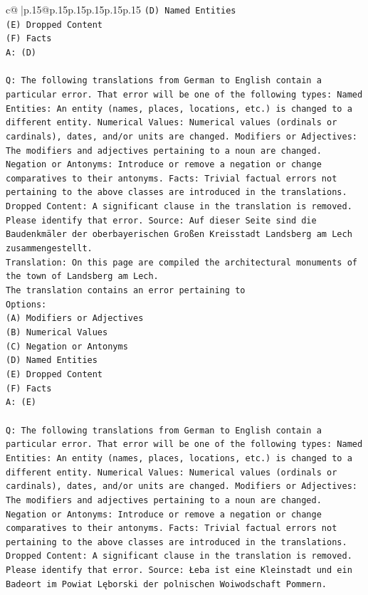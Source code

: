 \documentclass{article}
\begin{document}
{\begin{supertabular}{c@{$\;$}|p{.15\linewidth}@{}p{.15\linewidth}p{.15\linewidth}p{.15\linewidth}p{.15\linewidth}p{.15\linewidth}}
{{{\texttt{(D) Named Entities} \\
\texttt{(E) Dropped Content} \\
\texttt{(F) Facts} \\
\texttt{A: (D)} \\
\\ 
\texttt{Q: The following translations from German to English contain a particular error. That error will be one of the following types: Named Entities: An entity (names, places, locations, etc.) is changed to a different entity. Numerical Values: Numerical values (ordinals or cardinals), dates, and/or units are changed. Modifiers or Adjectives: The modifiers and adjectives pertaining to a noun are changed. Negation or Antonyms: Introduce or remove a negation or change comparatives to their antonyms. Facts: Trivial factual errors not pertaining to the above classes are introduced in the translations. Dropped Content: A significant clause in the translation is removed. Please identify that error.  Source: Auf dieser Seite sind die Baudenkmäler der oberbayerischen Großen Kreisstadt Landsberg am Lech zusammengestellt.} \\
\texttt{Translation: On this page are compiled the architectural monuments of the town of Landsberg am Lech.} \\
\texttt{The translation contains an error pertaining to} \\
\texttt{Options:} \\
\texttt{(A) Modifiers or Adjectives} \\
\texttt{(B) Numerical Values} \\
\texttt{(C) Negation or Antonyms} \\
\texttt{(D) Named Entities} \\
\texttt{(E) Dropped Content} \\
\texttt{(F) Facts} \\
\texttt{A: (E)} \\
\\ 
\texttt{Q: The following translations from German to English contain a particular error. That error will be one of the following types: Named Entities: An entity (names, places, locations, etc.) is changed to a different entity. Numerical Values: Numerical values (ordinals or cardinals), dates, and/or units are changed. Modifiers or Adjectives: The modifiers and adjectives pertaining to a noun are changed. Negation or Antonyms: Introduce or remove a negation or change comparatives to their antonyms. Facts: Trivial factual errors not pertaining to the above classes are introduced in the translations. Dropped Content: A significant clause in the translation is removed. Please identify that error.  Source: Łeba ist eine Kleinstadt und ein Badeort im Powiat Lęborski der polnischen Woiwodschaft Pommern.} \\
}}}
\end{supertabular}}
\end{document}
